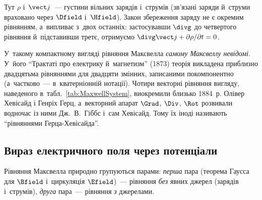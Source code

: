 Тут $\rho$ і~$\vect j$~--- густини вільних зарядів і~струмів (зв'язані заряди й~струми
враховано через $\Dfield$ і~$\Hfield$). Закон збереження заряду не є окремим рівнянням,
а~випливає з~двох останніх: застосувавши $\divg$ до четвертого рівняння й~підставивши
третє, отримуємо $\divg\vect j + \partial\rho/\partial t = 0$.

\begin{Historical}
	У~такому компактному вигляді рівняння Максвелла \emph{самому Максвеллу невідомі}.
	У~його \enquote{Трактаті про електрику й~магнетизм} (1873) теорія викладена приблизно
	двадцятьма рівняннями для двадцяти змінних, записаними покомпонентно (а~частково~---
	в~кватерніонній нотації). Чотири векторні рівняння вигляду, наведеного
	в~табл.~\ref{tab:MaxwellSystem}, виокремили близько 1884~р. Олівер Хевісайд і Генріх
	Герц, а~векторний апарат $\Grad$, $\Div$, $\Rot$ розвивали водночас із ними
	Дж.~В.~Гіббс і~сам Хевісайд. Тому їх іноді називають \enquote{рівняннями
	Герца-Хевісайда}.
\end{Historical}


\subsection*{Вираз електричного поля через потенціали}


Рівняння Максвелла природно групуються парами: \emph{перша} пара (теорема Гаусса для
$\Bfield$ і~циркуляція $\Efield$)~--- рівняння \emph{без} явних джерел (зарядів
і~струмів), \emph{друга} пара~--- рівняння \emph{з} джерелами.


